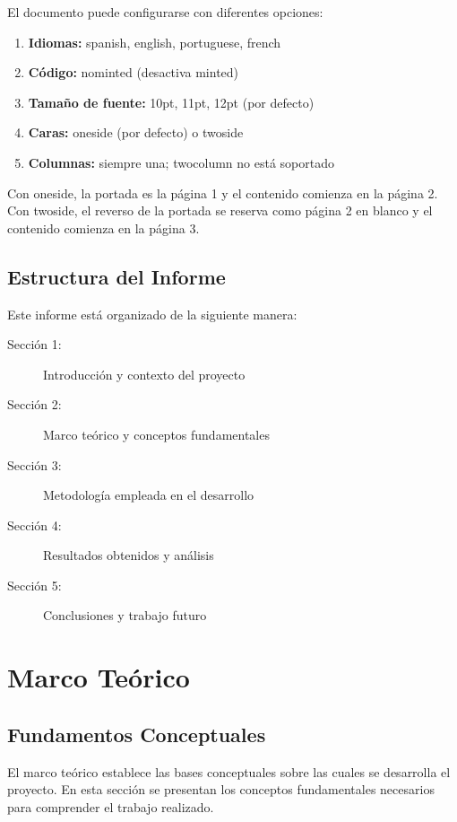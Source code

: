 \documentclass{pt-report}
\begin{document}
El documento puede configurarse con diferentes opciones:

\begin{enumerate}
    \item \textbf{Idiomas:} spanish, english, portuguese, french
    \item \textbf{Código:} nominted (desactiva minted)
    \item \textbf{Tamaño de fuente:} 10pt, 11pt, 12pt (por defecto)
    \item \textbf{Caras:} oneside (por defecto) o twoside
    \item \textbf{Columnas:} siempre una; twocolumn no está soportado
\end{enumerate}

Con oneside, la portada es la página 1 y el contenido comienza en la página 2.
Con twoside, el reverso de la portada se reserva como página 2 en blanco y el
contenido comienza en la página 3.

\subsection{Estructura del Informe}

Este informe está organizado de la siguiente manera:

\begin{description}
    \item[Sección 1:] Introducción y contexto del proyecto
    \item[Sección 2:] Marco teórico y conceptos fundamentales
    \item[Sección 3:] Metodología empleada en el desarrollo
    \item[Sección 4:] Resultados obtenidos y análisis
    \item[Sección 5:] Conclusiones y trabajo futuro
\end{description}

\section{Marco Teórico}

\subsection{Fundamentos Conceptuales}

El marco teórico establece las bases conceptuales sobre las cuales se desarrolla
el proyecto. En esta sección se presentan los conceptos fundamentales necesarios
para comprender el trabajo realizado.
\end{document}
